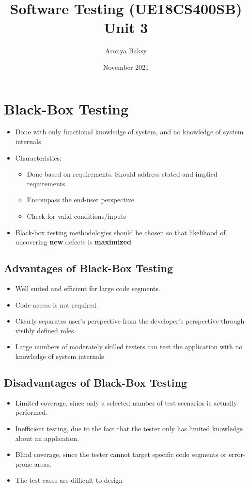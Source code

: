 \documentclass{article}
\title{Software Testing (UE18CS400SB) \\ Unit 3}
\author{Aronya Baksy}
\date{November 2021}
\begin{document}
\maketitle
\section{Black-Box Testing}
\begin{itemize}
    \item Done with only functional knowledge of system, and no knowledge of system internals
    
    \item Characteristics:
    \begin{itemize}
        \item Done based on requirements. Should address stated and implied requirements
        
        \item Encompass the end-user perspective
        
        \item Check for valid conditions/inputs
    \end{itemize}
    
    \item Black-box testing methodologies should be chosen so that likelihood of uncovering \textbf{new} defects is \textbf{maximized}
\end{itemize}
\subsection{Advantages of Black-Box Testing}
\begin{itemize}
    \item Well suited and efficient for large code segments.
    \item Code access is not required.
    \item Clearly separates user's perspective from the developer's perspective  through visibly defined roles.
    \item Large numbers of moderately skilled testers can test the application with no knowledge of system internals
\end{itemize}

\subsection{Disadvantages of Black-Box Testing}
\begin{itemize}
    \item Limited coverage, since only a selected number of test scenarios is  actually performed.
    \item Inefficient testing, due to the fact that the tester only has limited  knowledge about an application.
    \item Blind coverage, since the tester cannot target specific code segments or error-prone areas.
    \item The test cases are difficult to design
\end{itemize}
\end{document}
